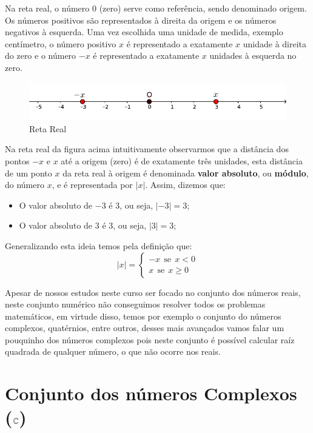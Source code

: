  Na reta real, o número $0$ (zero) serve como referência, sendo denominado origem. Os números positivos são representados à direita da origem e os números negativos à esquerda. Uma vez escolhida uma unidade de medida, exemplo centímetro, o número positivo $x$ é representado a exatamente $x$ unidade à direita do zero e o número $-x$ é representado a exatamente $x$ unidades à esquerda no zero.
 
  \begin{figure}[H]
 \centering
 \includegraphics[width=15cm]{../Topicos/Figuras/RetaReal.pdf}
 \caption{Reta Real}
 \end{figure}
 
 Na reta real da figura acima intuitivamente observarmos que a distância dos pontos $-x$ e $x$ até a origem (zero) é de exatamente três unidades, esta distância de um ponto $x$ da reta real à origem é denominada \textbf{valor absoluto}, ou \textbf{módulo}, do número $x$, e é representada por $|x|$. Assim, dizemos que:
\begin{itemize}
\item O valor absoluto de $-3$ é $3$, ou seja, $|-3|= 3$;
\item O valor absoluto de $3$ é $3$, ou seja, $|3|= 3$;
\end{itemize} 
Generalizando esta ideia temos pela definição que:
\[
|x|= \begin{cases}
      -x \ \ \text{se} \ \ x<0 \\
      x \ \ \text{se} \ \ x \geq 0
     \end{cases}
\]
 
Apesar de nossos estudos neste curso ser focado no conjunto dos números reais, neste conjunto numérico não conseguimos resolver todos os problemas matemáticos, em virtude disso, temos por exemplo o conjunto do números complexos, quatérnios, entre outros, desses mais avançados vamos falar um pouquinho dos números complexos pois neste conjunto é possível calcular raíz quadrada de qualquer número, o que não ocorre nos reais.

\section{Conjunto dos números Complexos (\texorpdfstring{$\mathbb{C}$}{C})}

